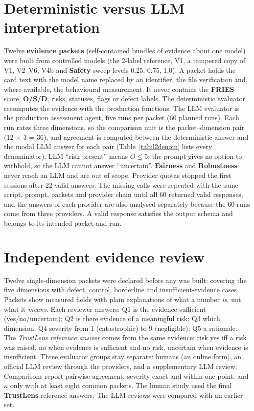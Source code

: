 \section{Deterministic versus LLM interpretation}\label{sec:l2m}
Twelve \textbf{evidence packets} (self-contained bundles of evidence about one model) were built from controlled models (the 2-label reference, V1, a tampered copy of V1, V2--V6, V4b and \textbf{Safety} sweep levels 0.25, 0.75, 1.0). A packet holds the card text with the model name replaced by an identifier, the file verification and, where available, the behavioural measurement. It never contains the \textbf{FRIES} score, \textbf{O/S/D}, risks, statuses, flags or defect labels. The deterministic evaluator recomputes the evidence with the production functions. The LLM evaluator is the production assessment agent, five runs per packet (60 planned runs). Each run rates three dimensions, so the comparison unit is the packet--dimension pair (12 $\times$ 3 = 36), and agreement is computed between the deterministic answer and the modal LLM answer for each pair (Table~\ref{tab:l2denom} lists every denominator). LLM ``risk present'' means $O\le5$; the prompt gives no option to withhold, so the LLM cannot answer ``uncertain''. \textbf{Fairness} and \textbf{Robustness} never reach an LLM and are out of scope. Provider quotas stopped the first sessions after 22 valid answers. The missing calls were repeated with the same script, prompt, packets and provider chain until all 60 returned valid responses, and the answers of each provider are also analysed separately because the 60 runs come from three providers. A valid response satisfies the output schema and belongs to its intended packet and run.

\section{Independent evidence review}\label{sec:l10m}
Twelve single-dimension packets were declared before any was built: covering the five dimensions with defect, control, borderline and insufficient-evidence cases. Packets show measured fields with plain explanations of what a number \emph{is}, not what it \emph{means}. Each reviewer answers: Q1 is the evidence sufficient (yes/no/uncertain); Q2 is there evidence of a meaningful risk; Q3 which dimension; Q4 severity from 1 (catastrophic) to 9 (negligible); Q5 a rationale. The \emph{TrustLens reference answer} comes from the same evidence: risk yes iff a risk was raised, no when evidence is sufficient and no risk, uncertain when evidence is insufficient. Three evaluator groups stay separate: humans (an online form), an official LLM review through the providers, and a supplementary LLM review. Comparisons report pairwise agreement, severity exact and within one point, and $\kappa$ only with at least eight common packets. The human study used the final \textbf{TrustLens} reference answers. The LLM reviews were compared with an earlier set.

